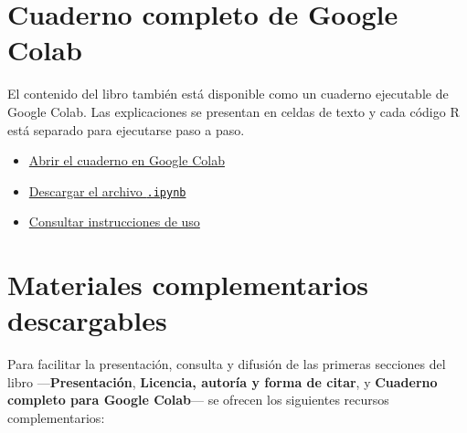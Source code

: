 \documentclass[
  spanish,
  10.5pt,
  letterpaper,
  openany,
  headings=big]{scrbook}
\providecommand{\tightlist}{%
  \setlength{\itemsep}{0pt}\setlength{\parskip}{0pt}}
\begin{document}
\section*{Cuaderno completo de Google
Colab}\label{cuaderno-completo-de-google-colab}


El contenido del libro también está disponible como un cuaderno
ejecutable de Google Colab. Las explicaciones se presentan en celdas de
texto y cada código R está separado para ejecutarse paso a paso.

\begin{itemize}
\tightlist
\item
  \href{https://colab.research.google.com/github/gilbertorodriguez59/libro-machine-learning-r-dev/blob/main/Aprendizaje_y_Clasificacion_Automatica_con_R_Colab.ipynb}{Abrir
  el cuaderno en Google Colab}
\item
  \href{Aprendizaje_y_Clasificacion_Automatica_con_R_Colab.ipynb}{Descargar
  el archivo \texttt{.ipynb}}
\item
  \href{00-cuaderno-google-colab.qmd}{Consultar instrucciones de uso}
\end{itemize}

\section*{Materiales complementarios
descargables}\label{materiales-complementarios-descargables}


Para facilitar la presentación, consulta y difusión de las primeras
secciones del libro ---\textbf{Presentación}, \textbf{Licencia, autoría
y forma de citar}, y \textbf{Cuaderno completo para Google Colab}--- se
ofrecen los siguientes recursos complementarios:
\end{document}
